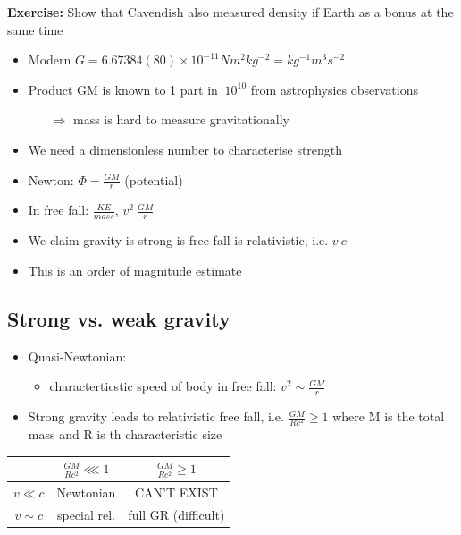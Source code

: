\documentclass[a4paper]{article} %
\newcommand{\exercise}[1]
{
\begin{framed}
\textbf{Exercise:} #1 
\end{framed}
}
\begin{document}
\exercise{Show that Cavendish also measured density if Earth as a bonus at the same time}

\begin{itemize}
\item Modern $G=6.67384(80)\times 10^{-11} Nm^2kg^{-2}=kg^{-1}m^3 s^{-2}$\\
\item Product GM is known to 1 part in $~10^{10}$ from astrophysics observations
\begin{itemize}
\item[$\Rightarrow$] mass is hard to measure gravitationally
\end{itemize}
\item We need a dimensionless number to characterise strength
\item Newton: $\Phi=\frac{GM}{r}$ (potential)
\item In free fall: $\frac{KE}{mass}$, $v^2 ~ \frac{GM}{r}$
\item We claim gravity is strong is free-fall is relativistic, i.e. $v~c$
\item This is an order of magnitude estimate
\end{itemize}


\subsection{Strong vs. weak gravity}
\begin{itemize}
\item Quasi-Newtonian:
\begin{itemize}
\item characterticstic speed of body in free fall: $v^2\sim \frac{GM}{r}$
\end{itemize}
\item Strong gravity leads to relativistic free fall, i.e. $\frac{GM}{Rc^2}\geq 1$ where M is the total mass and R is th characteristic size
\end{itemize}

\begin{table}
\centering
\begin{tabular}{c|cc} 
 & $\frac{GM}{Rc^2} \lll 1$ & $\frac{GM}{Rc^2}\geq 1$\\
\hline $v \ll c$ & Newtonian & CAN'T EXIST \\
$v\sim c$ & special rel. & full GR (difficult)
\end{tabular}
\end{table}
\end{document}
